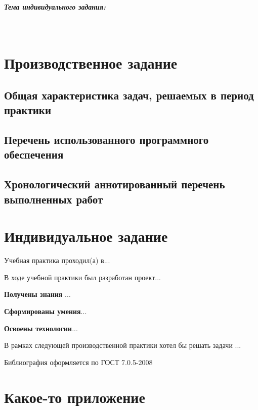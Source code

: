 \documentclass[14pt,Otchet]{diplomwork}
\newcommand{\alert}[1]{{\color{red}#1}}
\begin{document}
\paragraph{Тема индивидуального задания:}~\par


\chapter{Производственное задание}
\section{Общая характеристика задач, решаемых в период практики}

\section{Перечень использованного программного обеспечения}

\section{Хронологический аннотированный перечень выполненных работ}


\chapter{Индивидуальное задание}


Учебная практика проходил(а) в...

В ходе учебной практики был разработан проект...

\textbf{Получены знания} ...

\textbf{Сформированы умения}...

\textbf{Освоены технологии}...


В рамках следующей производственной практики хотел бы решать задачи ...





\begin{thebibliography}{99}

 \alert{Библиография оформляется по ГОСТ 7.0.5-2008} 


\end{thebibliography}

\APPENDIX
\chapter{Какое-то приложение}
\end{document}
